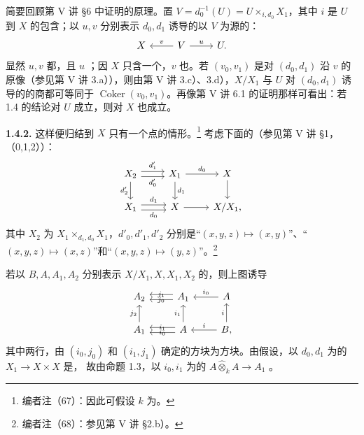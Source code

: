 简要回顾第 V 讲 \S6 中证明的原理。置 $V=d_0^{-1}(U)=U\times_{i,d_0}X_1$，其中 $i$ 是 $U$ 到 $X$ 的包含；以 $u,v$ 分别表示 $d_0,d_1$ 诱导的以 $V$ 为源的：
\[
\begin{tikzcd}
 X&V\arrow[l,"v"']\arrow[r,"u"]&U.
\end{tikzcd}
\]
显然 $u,v$ 都，且 $u$ ；因 $X$ 只含一个，$v$ 也。若 $(v_0,v_1)$ 是对 $(d_0,d_1)$ 沿 $v$ 的原像（参见第 V 讲 3.a）），则由第 V 讲 3.c）、3.d），$X/X_1$ 与 $U$ 对 $(d_0,d_1)$ 诱导的的商都可等同于 $\operatorname{Coker}(v_0,v_1)$。再像第 V 讲 6.1 的证明那样可看出：若 1.4 的结论对 $U$ 成立，则对 $X$ 也成立。

\textbf{1.4.2.} 这样便归结到 $X$ 只有一个点的情形。\footnote{编者注（67）：因此可假设 $k$ 为。} 考虑下面的（参见第 V 讲 \S1，（0,1,2））：
\[
\begin{tikzcd}
 X_2\arrow[r,shift left=.6ex,"d'_1"]\arrow[r,shift right=.6ex,"d'_0"']\arrow[d,"d'_2"']
 &X_1\arrow[r,"d_0"]\arrow[d,"d_1"]&X\arrow[d]\\
 X_1\arrow[r,shift left=.6ex,"d_1"]\arrow[r,shift right=.6ex,"d_0"']&X\arrow[r]&X/X_1,
\end{tikzcd}
\]
其中 $X_2$ 为 $X_1\times_{d_1,d_0}X_1$，$d'_0,d'_1,d'_2$ 分别是“$(x,y,z)\mapsto(x,y)$”、“$(x,y,z)\mapsto(x,z)$”和“$(x,y,z)\mapsto(y,z)$”。\footnote{编者注（68）：参见第 V 讲 \S2.b）。}

若以 $B,A,A_1,A_2$ 分别表示 $X/X_1,X,X_1,X_2$ 的，则上图诱导
\[
\begin{tikzcd}
 A_2&A_1\arrow[l,shift left=.6ex,"j_1"']\arrow[l,shift right=.6ex,"j_0"]&A\arrow[l,"i_0"']\\
 A_1\arrow[u,"j_2"]&A\arrow[l,shift left=.6ex,"i_1"']\arrow[l,shift right=.6ex,"i_0"]\arrow[u,"i_1"]&B\arrow[l,"i"']\arrow[u,"i"],
\end{tikzcd}
\]
其中两行，由 $(i_0,j_0)$ 和 $(i_1,j_1)$ 确定的方块为方块。由假设，以 $d_0,d_1$ 为的 $X_1\to X\times X$ 是，
故由命题 1.3，以 $i_0,i_1$ 为的 $A\widehat\otimes_k A\to A_1$ 。

